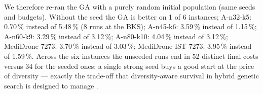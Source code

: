 We therefore re-ran the GA with a purely random initial population (same seeds and budgets). Without the seed the GA is better on 1 of 6 instances; A-n32-k5: 0.70\,\% instead of 5.48\,\% (8 runs at the BKS); A-n45-k6: 3.59\,\% instead of 1.15\,\%; A-n60-k9: 3.29\,\% instead of 3.12\,\%; A-n80-k10: 4.04\,\% instead of 3.12\,\%; MediDrone-7273: 3.70\,\% instead of 3.03\,\%; MediDrone-IST-7273: 3.95\,\% instead of 1.59\,\%. Across the six instances the unseeded runs end in 52 distinct final costs versus 34 for the seeded ones: a single strong seed buys a good start at the price of diversity --- exactly the trade-off that diversity-aware survival in hybrid genetic search is designed to manage \citep{vidal2012hybrid}.
